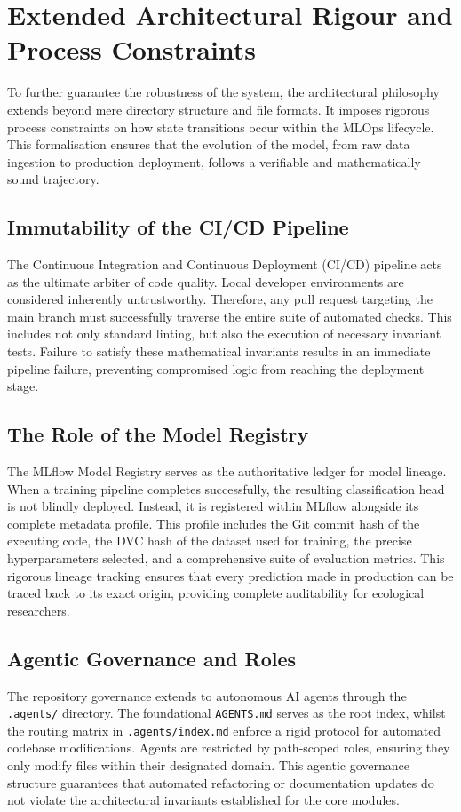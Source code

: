 \section{Extended Architectural Rigour and Process Constraints}
\label{sec:extended_rigour}

To further guarantee the robustness of the system, the architectural philosophy extends beyond mere directory structure and file formats. It imposes rigorous process constraints on how state transitions occur within the MLOps lifecycle. This formalisation ensures that the evolution of the model, from raw data ingestion to production deployment, follows a verifiable and mathematically sound trajectory.

\subsection{Immutability of the CI/CD Pipeline}
The Continuous Integration and Continuous Deployment (CI/CD) pipeline acts as the ultimate arbiter of code quality. Local developer environments are considered inherently untrustworthy. Therefore, any pull request targeting the main branch must successfully traverse the entire suite of automated checks. This includes not only standard linting, but also the execution of necessary invariant tests. Failure to satisfy these mathematical invariants results in an immediate pipeline failure, preventing compromised logic from reaching the deployment stage.

\subsection{The Role of the Model Registry}
The MLflow Model Registry serves as the authoritative ledger for model lineage. When a training pipeline completes successfully, the resulting classification head is not blindly deployed. Instead, it is registered within MLflow alongside its complete metadata profile. This profile includes the Git commit hash of the executing code, the DVC hash of the dataset used for training, the precise hyperparameters selected, and a comprehensive suite of evaluation metrics. This rigorous lineage tracking ensures that every prediction made in production can be traced back to its exact origin, providing complete auditability for ecological researchers.

\subsection{Agentic Governance and Roles}
The repository governance extends to autonomous AI agents through the \texttt{.agents/} directory. The foundational \texttt{AGENTS.md} serves as the root index, whilst the routing matrix in \texttt{.agents/index.md} enforce a rigid protocol for automated codebase modifications. Agents are restricted by path-scoped roles, ensuring they only modify files within their designated domain. This agentic governance structure guarantees that automated refactoring or documentation updates do not violate the architectural invariants established for the core modules.

